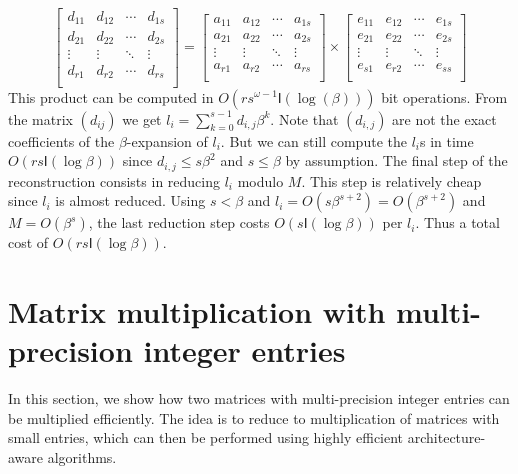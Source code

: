 \documentclass[acmtoms]{acmsmall}
\def\I{\mathsf{I}}
\begin{document}
\[
\renewcommand{\arraystretch}{1.5}
\begin{bmatrix}
	d_{11} & d_{12} & \cdots & d_{1s} \\
	d_{21} & d_{22} & \cdots & d_{2s} \\
	\vdots & \vdots & \ddots & \vdots \\
	d_{r1} & d_{r2} & \cdots & d_{rs} \\
\end{bmatrix}
=
\begin{bmatrix}
	a_{11} & a_{12} & \cdots & a_{1s} \\
	a_{21} & a_{22} & \cdots & a_{2s} \\
	\vdots & \vdots & \ddots & \vdots \\
	a_{r1} & a_{r2} & \cdots & a_{rs} \\
\end{bmatrix}
\times
\begin{bmatrix}
	e_{11} & e_{12} & \cdots & e_{1s} \\
	e_{21} & e_{22} & \cdots & e_{2s} \\
	\vdots & \vdots & \ddots & \vdots \\
	e_{s1} & e_{r2} & \cdots & e_{ss} \\
\end{bmatrix}
\]
This product can be computed in $O \left( rs^{\omega - 1} \I (\log (\beta)) \right)$ bit 
operations. From the matrix $(d_{ij})$ we get $l_i = \sum_{k = 0}^{s - 1} d_{i, j} \beta^k$.
Note that $(d_{i, j})$ are not the exact coefficients of the $\beta$-expansion
of $l_i$. But we can still compute the $l_i$s in time $O(r s \I(\log \beta))$
since $d_{i, j} \leqslant s \beta^2$ and $s \leqslant \beta$ by assumption.
The final step of the reconstruction
consists in reducing $l_i$ modulo $M$. This step is relatively cheap since $l_i$
is almost reduced.  Using $s < \beta$ and $l_i =O (s \beta^{s + 2}) = O(\beta^{s + 2})$ and
$M =O (\beta^s)$, the last reduction step costs $O \left( s \I (\log \beta) \right)$ per $l_i$. 
Thus a total cost of $O (r s \I (\log \beta))$.




\section{Matrix multiplication with multi-precision integer entries}
\label{sec:multi-mod-mm}

In this section, we show how two matrices with multi-precision integer entries can be multiplied 
efficiently. The idea is to reduce to multiplication of matrices with small entries, which can then 
be performed using highly efficient architecture-aware algorithms. 
\end{document}
